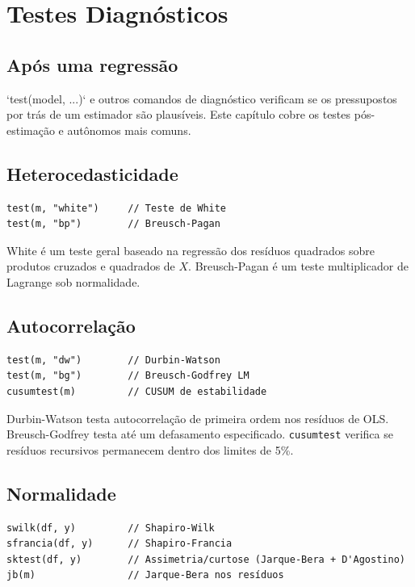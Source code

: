 \chapter{Testes Diagnósticos}

\section{Após uma regressão}

`test(model, ...)` e outros comandos de diagnóstico verificam se os
pressupostos por trás de um estimador são plausíveis. Este capítulo
cobre os testes pós-estimação e autônomos mais comuns.

\section{Heterocedasticidade}

\begin{lstlisting}[caption={Testes de White e Breusch-Pagan}]
test(m, "white")     // Teste de White
test(m, "bp")        // Breusch-Pagan
\end{lstlisting}

White é um teste geral baseado na regressão dos resíduos quadrados
sobre produtos cruzados e quadrados de $X$. Breusch-Pagan é um teste
multiplicador de Lagrange sob normalidade.

\section{Autocorrelação}

\begin{lstlisting}[caption={Testes de autocorrelação}]
test(m, "dw")        // Durbin-Watson
test(m, "bg")        // Breusch-Godfrey LM
cusumtest(m)         // CUSUM de estabilidade
\end{lstlisting}

Durbin-Watson testa autocorrelação de primeira ordem nos resíduos de
OLS. Breusch-Godfrey testa até um defasamento especificado.
\texttt{cusumtest} verifica se resíduos recursivos permanecem dentro dos
limites de 5\%.

\section{Normalidade}

\begin{lstlisting}[caption={Testes de normalidade}]
swilk(df, y)         // Shapiro-Wilk
sfrancia(df, y)      // Shapiro-Francia
sktest(df, y)        // Assimetria/curtose (Jarque-Bera + D'Agostino)
jb(m)                // Jarque-Bera nos resíduos
\end{lstlisting}

